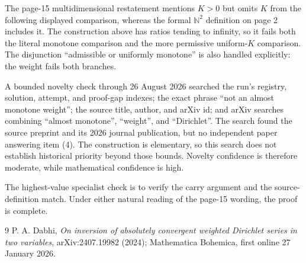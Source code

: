 \documentclass[11pt]{article}
\theoremstyle{remark}
\newcommand{\N}{\mathbb N}
\begin{document}
The page-15 multidimensional restatement mentions $K>0$ but omits $K$ from
the following displayed comparison, whereas the formal $\N^2$ definition on
page 2 includes it. The construction above has ratios tending to infinity,
so it fails both the literal monotone comparison and the more permissive
uniform-$K$ comparison. The disjunction ``admissible or uniformly monotone''
is also handled explicitly: the weight fails both branches.

A bounded novelty check through 26 August 2026 searched the run's registry,
solution, attempt, and proof-gap indexes; the exact phrase ``not an almost
monotone weight''; the source title, author, and arXiv id; and arXiv searches
combining ``almost monotone'', ``weight'', and ``Dirichlet''. The search found
the source preprint and its 2026 journal publication, but no independent paper
answering item (4). The construction is elementary, so this search does not
establish historical priority beyond those bounds. Novelty confidence is
therefore moderate, while mathematical confidence is high.

The highest-value specialist check is to verify the carry argument and the
source-definition match. Under either natural reading of the page-15 wording,
the proof is complete.

\begingroup
\small
\begin{thebibliography}{9}
P. A. Dabhi,
\emph{On inversion of absolutely convergent weighted Dirichlet series in two
variables}, arXiv:2407.19982 (2024); Mathematica Bohemica, first online
27 January 2026.
\end{thebibliography}
\endgroup
\end{document}
